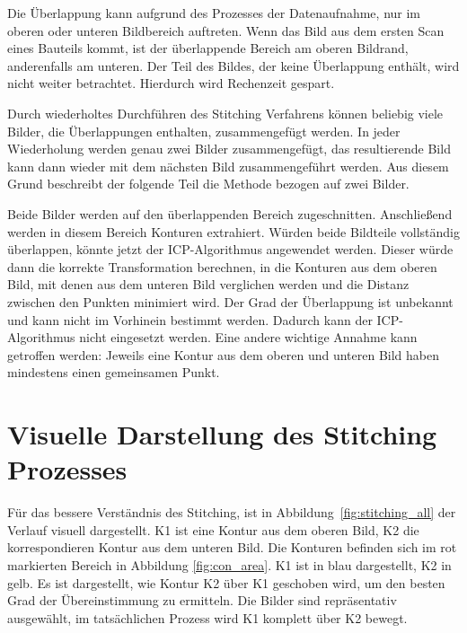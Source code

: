 Die Überlappung kann aufgrund des Prozesses der Datenaufnahme, 
nur im oberen oder unteren Bildbereich auftreten. Wenn das Bild 
aus dem ersten Scan eines Bauteils kommt, ist der überlappende Bereich am 
oberen Bildrand, anderenfalls am unteren. 
Der Teil des Bildes, der keine Überlappung enthält, wird nicht weiter betrachtet. 
Hierdurch wird Rechenzeit gespart.

Durch wiederholtes Durchführen des Stitching Verfahrens können beliebig viele Bilder, 
die Überlappungen enthalten, zusammengefügt werden. In jeder Wiederholung werden genau
zwei Bilder zusammengefügt, das resultierende Bild kann dann wieder mit dem
nächsten Bild zusammengeführt werden. Aus diesem Grund beschreibt der folgende 
Teil die Methode bezogen auf zwei Bilder.

Beide Bilder werden auf den überlappenden Bereich zugeschnitten. 
Anschließend werden in diesem Bereich Konturen extrahiert. 
Würden beide Bildteile vollständig überlappen, könnte jetzt der ICP-Algorithmus
angewendet werden. Dieser würde dann die korrekte Transformation berechnen, in 
die Konturen aus dem oberen Bild, mit denen aus dem unteren Bild verglichen werden
und die Distanz zwischen den Punkten minimiert wird. 
Der Grad der Überlappung ist unbekannt und kann nicht im Vorhinein bestimmt werden.
Dadurch kann der ICP-Algorithmus nicht eingesetzt werden. 
Eine andere wichtige Annahme kann getroffen werden: Jeweils eine Kontur aus 
dem oberen und unteren Bild haben mindestens einen gemeinsamen Punkt.

\section{Visuelle Darstellung des Stitching Prozesses}

Für das bessere Verständnis des Stitching, ist in Abbildung~\ref{fig:stitching_all} 
der Verlauf visuell dargestellt.
K1 ist eine Kontur aus dem oberen Bild, K2 die korrespondieren Kontur aus dem 
unteren Bild. Die Konturen befinden sich im rot markierten Bereich in Abbildung 
\ref{fig:con_area}.
K1 ist in blau dargestellt, K2 in gelb. Es ist dargestellt, wie
Kontur K2 über K1 geschoben wird, um den besten Grad der Übereinstimmung zu ermitteln.
Die Bilder sind repräsentativ ausgewählt, im tatsächlichen Prozess wird K1 komplett 
über K2 bewegt.

